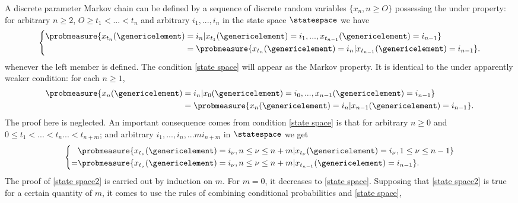 A discrete parameter Markov chain can be defined by a sequence of discrete random variables $\{x_n, n\geq O\}$ possessing the under property: for arbitrary $n \geq 2$, $O\geq t_1 < ... < t_n$ and arbitrary $i_1, ... , i_n$ in the state space $\statespace$ we have
\begin{equation}
    \left\{
        \begin{aligned}
       \probmeasure \{x_{t_n}(\genericelement) &= i_n | x_{t_1}(\genericelement) = i_1, ... ,x_{t_{n-1}}(\genericelement) = i_{n-1}\} \\
       &= \probmeasure\{x_{t_n}(\genericelement) = i_n | x_{t_{n-1}}(\genericelement) = i_{n-1}\} .
        \end{aligned}
    \right.
    \label{state space}
\end{equation} 
whenever the left member is defined. The condition \ref{state space} will appear as the Markov property. It is identical to the under apparently weaker condition: for each $n\geq 1$,
\begin{equation}
    \begin{aligned}
        \probmeasure \{x_n(\genericelement) &= i_n| x_0(\genericelement) = i_0,...,x_{n-1}(\genericelement)=i_{n-1}\} \\ &=\probmeasure \{x_n(\genericelement)=i_n|x_{n-1}(\genericelement)=i_{n-1}\}.
    \end{aligned}
\end{equation}
The proof here is neglected. An important consequence comes from condition \ref{state space} is that for arbitrary $n \geq 0$ and $0\leq t_1<...<t_n...<t_{n+m}$; and arbitrary $i_1,...,i_n,...mi_{n+m}$ in $\statespace$ we get
\begin{equation}
    \left\{
        \begin{aligned}
            \ & \probmeasure\{x_{t_\nu}(\genericelement)=i_\nu, n\leq \nu \leq n+m|x_{t_\nu}(\genericelement)=i_\nu, 1\leq \nu \leq n-1\} \\
            =& \probmeasure \{x_{t_\nu}(\genericelement) = i_\nu, n\leq \nu \leq n+m|x_{t_{n-1}}(\genericelement)=i_{n-1}\}.
        \end{aligned}
        \right.
        \label{state space2}
\end{equation}
The proof of \ref{state space2} is carried out by induction on $m$. For $m = 0$, it decreases to \ref{state space}. Supposing that \ref{state space2} is true for a certain quantity of $m$, it comes to use the rules of combining conditional probabilities and \ref{state space},

